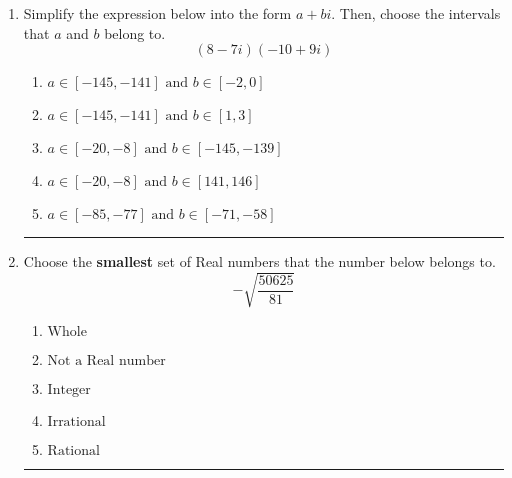 \documentclass[14pt]{extbook}
\newcommand{\litem}[1]{\item#1\hspace*{-1cm}\rule{\textwidth}{0.4pt}}
\begin{document}
\begin{enumerate}
{\begin{enumerate}[label=\Alph*.]
\end{enumerate} }
\litem{
Simplify the expression below into the form $a+bi$. Then, choose the intervals that $a$ and $b$ belong to.\[ (8 - 7 i)(-10 + 9 i) \]\begin{enumerate}[label=\Alph*.]
\item \( a \in [-145, -141] \text{ and } b \in [-2, 0] \)
\item \( a \in [-145, -141] \text{ and } b \in [1, 3] \)
\item \( a \in [-20, -8] \text{ and } b \in [-145, -139] \)
\item \( a \in [-20, -8] \text{ and } b \in [141, 146] \)
\item \( a \in [-85, -77] \text{ and } b \in [-71, -58] \)

\end{enumerate} }
\litem{
Choose the \textbf{smallest} set of Real numbers that the number below belongs to.\[ -\sqrt{\frac{50625}{81}} \]\begin{enumerate}[label=\Alph*.]
\item \( \text{Whole} \)
\item \( \text{Not a Real number} \)
\item \( \text{Integer} \)
\item \( \text{Irrational} \)
\item \( \text{Rational} \)

\end{enumerate} }
\end{enumerate}
\end{document}
